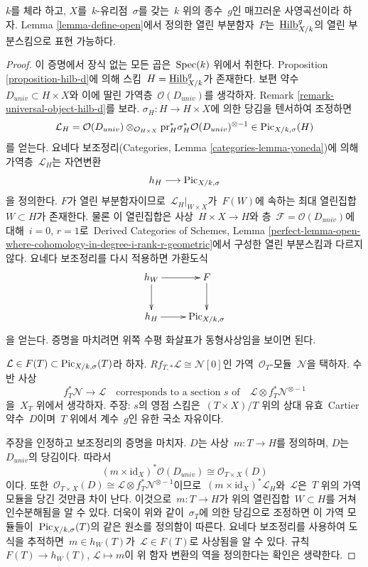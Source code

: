 \begin{lemma}
\label{lemma-open-representable}
$k$를 체라 하고, $X$를\  $k$-유리점\  $\sigma$를 갖는\  $k$ 위의 종수\  $g$인
매끄러운 사영곡선이라 하자. Lemma \ref{lemma-define-open}에서 정의한 열린
부분함자\  $F$는\  $\underline{\mathrm{Hilb}}^g_{X/k}$의 열린 부분스킴으로
표현 가능하다.
\end{lemma}

\begin{proof}
이 증명에서 장식 없는 모든 곱은\  $\mathop{\mathrm{Spec}}(k)$ 위에서 취한다.
Proposition \ref{proposition-hilb-d}에 의해 스킴\ 
$H = \underline{\mathrm{Hilb}}^g_{X/k}$가 존재한다. 보편 약수\ 
$D_{univ} \subset H \times X$와 이에 딸린 가역층\ 
$\mathcal{O}(D_{univ})$를 생각하자. Remark
\ref{remark-universal-object-hilb-d}를 보라. $\sigma_H : H \to H \times X$에
의한 당김을 텐서하여 조정하면
$$
\mathcal{L}_H =
\mathcal{O}(D_{univ})
\otimes_{\mathcal{O}_{H \times X}}
\text{pr}_H^*\sigma_H^*\mathcal{O}(D_{univ})^{\otimes -1}
\in
\mathrm{Pic}_{X/k, \sigma}(H)
$$
를 얻는다. 요네다 보조정리(Categories, Lemma
\ref{categories-lemma-yoneda})에 의해 가역층\  $\mathcal{L}_H$는 자연변환
$$
h_H \longrightarrow \mathrm{Pic}_{X/k, \sigma}
$$
을 정의한다. $F$가 열린 부분함자이므로\ 
$\mathcal{L}_H|_{W \times X}$가\  $F(W)$에 속하는 최대 열린집합\ 
$W \subset H$가 존재한다. 물론 이 열린집합은 사상\  $H \times X \to H$와
층\  $\mathcal{F} = \mathcal{O}(D_{univ})$에 대해\  $i = 0$, $r = 1$로\ 
Derived Categories of Schemes, Lemma
\ref{perfect-lemma-open-where-cohomology-in-degree-i-rank-r-geometric}에서
구성한 열린 부분스킴과 다르지 않다. 요네다 보조정리를 다시 적용하면
가환도식
$$
\xymatrix{
h_W \ar[d] \ar[r] & F \ar[d] \\
h_H \ar[r] & \Picardfunctor_{X/k, \sigma}
}
$$
을 얻는다. 증명을 마치려면 위쪽 수평 화살표가 동형사상임을 보이면 된다.

\medskip\noindent
$\mathcal{L} \in F(T) \subset \mathrm{Pic}_{X/k, \sigma}(T)$라 하자.
$Rf_{T, *}\mathcal{L} \cong \mathcal{N}[0]$인 가역\ 
$\mathcal{O}_T$-모듈\  $\mathcal{N}$을 택하자. 수반 사상
$$
f_T^*\mathcal{N} \longrightarrow \mathcal{L}
\quad\text{corresponds to a section }s\text{ of}\quad
\mathcal{L} \otimes f_T^*\mathcal{N}^{\otimes -1}
$$
을\  $X_T$ 위에서 생각하자. 주장: $s$의 영점 스킴은\  $(T \times X)/T$ 위의
상대 유효\  Cartier 약수\  $D$이며\  $T$ 위에서 계수\  $g$인 유한 국소 자유이다.

\medskip\noindent
주장을 인정하고 보조정리의 증명을 마치자. $D$는 사상\ 
$m : T \to H$를 정의하며, $D$는\  $D_{univ}$의 당김이다. 따라서
$$
(m \times \text{id}_X)^*\mathcal{O}(D_{univ}) \cong
\mathcal{O}_{T \times X}(D)
$$
이다. 또한\ 
$\mathcal{O}_{T \times X}(D) \cong
\mathcal{L} \otimes f_T^*\mathcal{N}^{\otimes -1}$이므로\ 
$(m \times \text{id}_X)^*\mathcal{L}_H$와\  $\mathcal{L}$은\  $T$ 위의 가역
모듈을 당긴 것만큼 차이 난다. 이것으로\  $m : T \to H$가 위의 열린집합\ 
$W \subset H$를 거쳐 인수분해됨을 알 수 있다. 더욱이 위와 같이\ 
$\sigma_T$에 의한 당김으로 조정하면 이 가역 모듈들이\ 
$\mathrm{Pic}_{X/k, \sigma}(T)$의 같은 원소를 정의함이 따른다.
요네다 보조정리를 사용하여 도식을 추적하면\  $m \in h_W(T)$가\ 
$\mathcal{L} \in F(T)$로 사상됨을 알 수 있다. 규칙\ 
$F(T) \to h_W(T)$, $\mathcal{L} \mapsto m$이 위 함자 변환의 역을
정의한다는 확인은 생략한다.


\end{proof}
